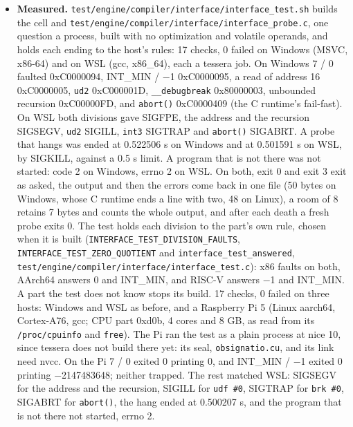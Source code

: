 \begin{enumerate}
\begin{itemize}
\begin{enumerate}
\begin{itemize}
\item \textbf{Measured.} \texttt{test/\allowbreak{}engine/\allowbreak{}compiler/\allowbreak{}interface/\allowbreak{}interface\_\allowbreak{}test.\allowbreak{}sh} builds the cell and \texttt{test/\allowbreak{}engine/\allowbreak{}compiler/\allowbreak{}interface/\allowbreak{}interface\_\allowbreak{}probe.\allowbreak{}c}, one question a process, built with no optimization and volatile operands, and holds each ending to the host's rules: 17 checks, 0 failed on Windows (MSVC, x86-64) and on WSL (gcc, x86\_\allowbreak{}64), each a tessera job. On Windows 7 / 0 faulted 0xC0000094, INT\_\allowbreak{}MIN / −1 0xC0000095, a read of address 16 0xC0000005, \texttt{ud2} 0xC000001D, \texttt{\_\allowbreak{}\_\allowbreak{}debugbreak} 0x80000003, unbounded recursion 0xC00000FD, and \texttt{abort()} 0xC0000409 (the C runtime's fail-fast). On WSL both divisions gave SIGFPE, the address and the recursion SIGSEGV, \texttt{ud2} SIGILL, \texttt{int3} SIGTRAP and \texttt{abort()} SIGABRT. A probe that hangs was ended at 0.522506 s on Windows and at 0.501591 s on WSL, by SIGKILL, against a 0.5 s limit. A program that is not there was not started: code 2 on Windows, errno 2 on WSL. On both, exit 0 and exit 3 exit as asked, the output and then the errors come back in one file (50 bytes on Windows, whose C runtime ends a line with two, 48 on Linux), a room of 8 retains 7 bytes and counts the whole output, and after each death a fresh probe exits 0. The test holds each division to the part's own rule, chosen when it is built (\texttt{INTERFACE\_\allowbreak{}TEST\_\allowbreak{}DIVISION\_\allowbreak{}FAULTS}, \texttt{INTERFACE\_\allowbreak{}TEST\_\allowbreak{}ZERO\_\allowbreak{}QUOTIENT} and \texttt{interface\_\allowbreak{}test\_\allowbreak{}answered}, \texttt{test/\allowbreak{}engine/\allowbreak{}compiler/\allowbreak{}interface/\allowbreak{}interface\_\allowbreak{}test.\allowbreak{}c}): x86 faults on both, AArch64 answers 0 and INT\_\allowbreak{}MIN, and RISC-V answers −1 and INT\_\allowbreak{}MIN. A part the test does not know stops its build. 17 checks, 0 failed on three hosts: Windows and WSL as before, and a Raspberry Pi 5 (Linux aarch64, Cortex-A76, gcc; CPU part 0xd0b, 4 cores and 8 GB, as read from its \texttt{/\allowbreak{}proc/\allowbreak{}cpuinfo} and \texttt{free}). The Pi ran the test as a plain process at nice 10, since tessera does not build there yet: its seal, \texttt{obsignatio.\allowbreak{}cu}, and its link need nvcc. On the Pi 7 / 0 exited 0 printing 0, and INT\_\allowbreak{}MIN / −1 exited 0 printing −2147483648; neither trapped. The rest matched WSL: SIGSEGV for the address and the recursion, SIGILL for \texttt{udf \#0}, SIGTRAP for \texttt{brk \#0}, SIGABRT for \texttt{abort()}, the hang ended at 0.500207 s, and the program that is not there not started, errno 2.

\end{itemize}
\end{enumerate}
\end{itemize}
\end{enumerate}
